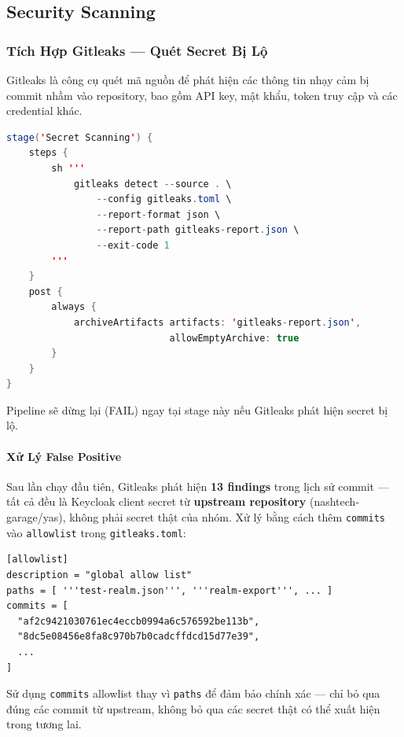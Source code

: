 \subsection{Security Scanning}

\subsubsection{Tích Hợp Gitleaks --- Quét Secret Bị Lộ}

Gitleaks là công cụ quét mã nguồn để phát hiện các thông tin nhạy cảm bị commit nhầm vào repository, bao gồm API key, mật khẩu, token truy cập và các credential khác.

\begin{lstlisting}[language=Java, caption={Stage Secret Scanning trong Jenkinsfile}]
stage('Secret Scanning') {
    steps {
        sh '''
            gitleaks detect --source . \
                --config gitleaks.toml \
                --report-format json \
                --report-path gitleaks-report.json \
                --exit-code 1
        '''
    }
    post {
        always {
            archiveArtifacts artifacts: 'gitleaks-report.json',
                             allowEmptyArchive: true
        }
    }
}
\end{lstlisting}

Pipeline sẽ dừng lại (FAIL) ngay tại stage này nếu Gitleaks phát hiện secret bị lộ.

\paragraph{Xử Lý False Positive}

Sau lần chạy đầu tiên, Gitleaks phát hiện \textbf{13 findings} trong lịch sử commit --- tất cả đều là Keycloak client secret từ \textbf{upstream repository} (nashtech-garage/yas), không phải secret thật của nhóm. Xử lý bằng cách thêm \texttt{commits} vào \texttt{allowlist} trong \texttt{gitleaks.toml}:

\begin{lstlisting}[caption={Cấu hình allowlist trong gitleaks.toml}]
[allowlist]
description = "global allow list"
paths = [ '''test-realm.json''', '''realm-export''', ... ]
commits = [
  "af2c9421030761ec4eccb0994a6c576592be113b",
  "8dc5e08456e8fa8c970b7b0cadcffdcd15d77e39",
  ...
]
\end{lstlisting}

Sử dụng \texttt{commits} allowlist thay vì \texttt{paths} để đảm bảo chính xác --- chỉ bỏ qua đúng các commit từ upstream, không bỏ qua các secret thật có thể xuất hiện trong tương lai.

